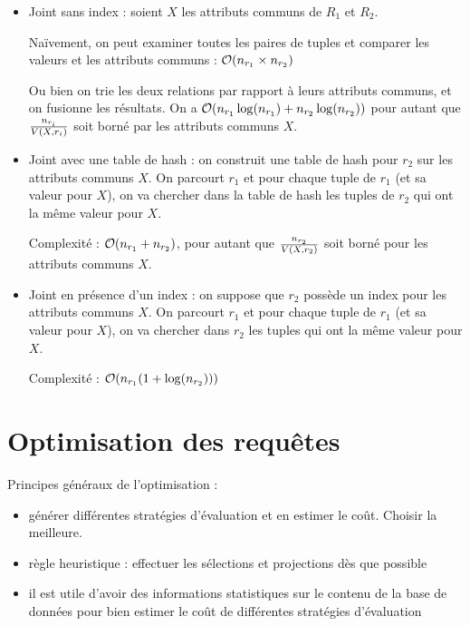 		\begin{itemize}
			\item Joint sans index : soient $X$ les attributs communs de $R_1$ et $R_2$.
			
			Naïvement, on peut examiner toutes les paires de tuples et comparer les valeurs et les attributs communs : $\mathcal{O}(n_{r_1} \times n_{r_2})$ 
			
			Ou bien on trie les deux relations par rapport à leurs attributs communs, et on fusionne les résultats. On a $\mathcal{O} (n_{r_1} \log(n_{r_1}) + n_{r_2} \log(n_{r_2}))$ pour autant que $\frac{n_{r_i}}{V(X, r_i)}$ soit borné par les attributs communs $X$.
			
			
			\item Joint avec une table de hash : on construit une table de hash pour $r_2$ sur les attributs communs $X$. On parcourt $r_1$ et pour chaque tuple de $r_1$ (et sa valeur pour $X$), on va chercher dans la table de hash les tuples de $r_2$ qui ont la même valeur pour $X$.
			
			Complexité : $\mathcal{O}(n_{r_1} + n_{r_2})$, pour autant que $\frac{n_{r_2}}{V(X, r_2)}$ soit borné pour les attributs communs $X$.
			
			
			
			\item Joint en présence d'un index : on suppose que $r_2$ possède un index pour les attributs communs $X$. On parcourt $r_1$ et pour chaque tuple de $r_1$ (et sa valeur pour $X$), on va chercher dans $r_2$ les tuples qui ont la même valeur pour $X$.
			
			Complexité : $\mathcal{O}(n_{r_1} (1 + \log(n_{r_2})))$
		\end{itemize}
		
	\section{Optimisation des requêtes}
	
	
	Principes généraux de l'optimisation :
	
	\begin{itemize}
		\item générer différentes stratégies d'évaluation et en estimer le coût. Choisir la meilleure.
		\item règle heuristique : effectuer les sélections et projections dès que possible
		\item il est utile d'avoir des informations statistiques sur le contenu de la base de données pour bien estimer le coût de différentes stratégies d'évaluation
	\end{itemize}
	
